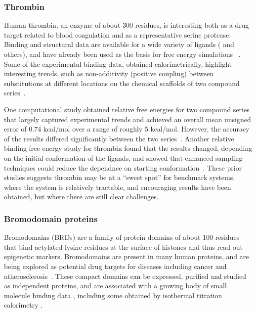 \documentclass[aps,pre,twocolumn,nofootinbib,superscriptaddress,10pt, final,tightenlines]{revtex4-1}
\begin{document}
\subsubsection{Thrombin}
Human thrombin, an enzyme of about 300 residues, is interesting both as a drug target related to blood coagulation and as a representative serine protease. 
Binding and structural data are available for a wide variety of ligands (\cite{baum_non-additivity_2010, StefanicAnderluh:2005:J.Med.Chem., Ueno:2005:Bioorganic&MedicinalChemistryLetters, Putta:2005:J.Med.Chem., baum_non-additivity_2010} and others),
and have already been used as the basis for free energy simulations ~\cite{wang_achieving_2012, schrodinger_accurate_2015, calabro_elucidation_2016}.
Some of the experimental binding data, obtained calorimetrically, highlight interesting trends, such as non-additivity (positive coupling) between substitutions at different locations on the chemical scaffolds of two compound series~\cite{baum_non-additivity_2010}. 

One computational study obtained relative free energies for two compound series that largely captured experimental trends and achieved an overall mean unsigned error of 0.74 kcal/mol over a range of roughly 5 kcal/mol.
However, the accuracy of the results differed significantly between the two series~\cite{calabro_elucidation_2016}.
Another relative binding free energy study for thrombin found that the results changed, depending on the initial conformation of the ligands, and showed that enhanced sampling techniques could reduce the dependnce on starting conformation~\cite{wang_achieving_2012}.
These prior studies suggests thrombin may be at a ``sweet spot'' for benchmark systems, where the system is relatively tractable, and encouraging results have been obtained, but where there are still clear challenges. 


\subsubsection{Bromodomain proteins}
Bromodomains (BRDs) are a family of protein domains of about 100 residues that bind actylated lysine residues at the surface of histones and thus read out epigenetic markers.
Bromodomains are present in many human proteins, and are being explored as potential drug targets for diseases including cancer and atherosclerosis~\cite{aldeghi_accurate_2016}.
These compact domains can be expressed, purified and studied as independent proteins, and are associated with a growing body of small molecule binding data \cite{Filippakopoulos:2010:Nature, Chung:2011:J.Med.Chem., Hewings:2012:J.Med.Chem., Bamborough:2015:J.Med.Chem., Ran:2015:J.Med.Chem., Zhang:2013:J.Med.Chem., Gosmini:2014:J.Med.Chem., Yang:2016:BioorganicChemistry}, including some obtained by isothermal titration calorimetry \cite{Filippakopoulos:2010:Nature, Chung:2011:J.Med.Chem., Hewings:2012:J.Med.Chem., Gosmini:2014:J.Med.Chem.}.
\end{document}
